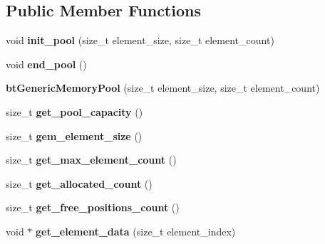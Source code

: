 \subsection*{Public Member Functions}
\begin{DoxyCompactItemize}
\item 
\mbox{\label{classbtGenericMemoryPool_a737c1ad587dc82b2fac01096ac0a7b41}} 
void {\bfseries init\+\_\+pool} (size\+\_\+t element\+\_\+size, size\+\_\+t element\+\_\+count)
\item 
\mbox{\label{classbtGenericMemoryPool_a7830d0b91b596c10b52da3b4ade2e41d}} 
void {\bfseries end\+\_\+pool} ()
\item 
\mbox{\label{classbtGenericMemoryPool_a2507290a6ad7e0e04f81da3a7d97caeb}} 
{\bfseries bt\+Generic\+Memory\+Pool} (size\+\_\+t element\+\_\+size, size\+\_\+t element\+\_\+count)
\item 
\mbox{\label{classbtGenericMemoryPool_acf029799be7eb09e276e27bb2296e14a}} 
size\+\_\+t {\bfseries get\+\_\+pool\+\_\+capacity} ()
\item 
\mbox{\label{classbtGenericMemoryPool_a728395d36923dd3f480d0320dfb0a3f2}} 
size\+\_\+t {\bfseries gem\+\_\+element\+\_\+size} ()
\item 
\mbox{\label{classbtGenericMemoryPool_ad4a523dabab835e0e786661b628dbb6b}} 
size\+\_\+t {\bfseries get\+\_\+max\+\_\+element\+\_\+count} ()
\item 
\mbox{\label{classbtGenericMemoryPool_a6e483e9117e17c8df23ba42a12283ea6}} 
size\+\_\+t {\bfseries get\+\_\+allocated\+\_\+count} ()
\item 
\mbox{\label{classbtGenericMemoryPool_a969d29bf5f9b52a8d9d34ed9f529e3f9}} 
size\+\_\+t {\bfseries get\+\_\+free\+\_\+positions\+\_\+count} ()
\item 
\mbox{\label{classbtGenericMemoryPool_aab43c7fd24932f6a1e8b593672df6008}} 
void $\ast$ {\bfseries get\+\_\+element\+\_\+data} (size\+\_\+t element\+\_\+index)

\end{DoxyCompactItemize}
